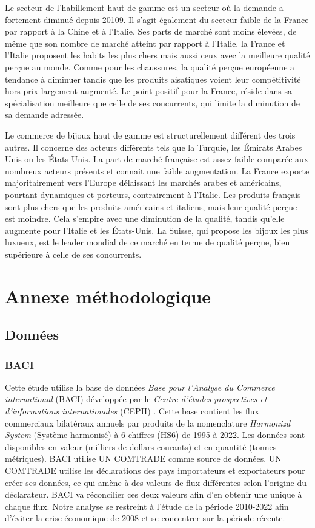 \documentclass[french,10pt,a4paper]{article}
\begin{document}
\bigskip

Le secteur de l'habillement haut de gamme est un secteur où la demande a fortement diminué depuis 20109. Il s'agit également du secteur faible de la France par rapport à la Chine et à l'Italie. Ses parts de marché sont moins élevées, de même que son nombre de marché atteint par rapport à l'Italie. la France et l'Italie proposent les habits les plus chers mais aussi ceux avec la meilleure qualité perçue au monde. Comme pour les chaussures, la qualité perçue européenne a tendance à diminuer tandis que les produits aisatiques voient leur compétitivité hors-prix largement augmenté. Le point positif pour la France, réside dans sa spécialisation meilleure que celle de ses concurrents, qui limite la diminution de sa demande adressée. 

\bigskip

Le commerce de bijoux haut de gamme est structurellement différent des trois autres. Il concerne des acteurs différents tels que la Turquie, les Émirats Arabes Unis ou les États-Unis. La part de marché française est assez faible comparée aux nombreux acteurs présents et connait une faible augmentation. La France exporte majoritairement vers l'Europe délaissant les marchés arabes et américains, pourtant dynamiques et porteurs, contrairement à l'Italie. Les produits français sont plus chers que les produits américains et italiens, mais leur qualité perçue est moindre. Cela s'empire avec une diminution de la qualité, tandis qu'elle augmente pour l'Italie et les États-Unis. La Suisse, qui propose les bijoux les plus luxueux, est le leader mondial de ce marché en terme de qualité perçue, bien supérieure à celle de ses concurrents.



\newpage

\section*{Annexe méthodologique}
\subsection*{Données}
\subsubsection*{BACI}
Cette étude utilise la base de données \textit{Base pour l'Analyse du Commerce international} (BACI) développée par le \textit{Centre d'études prospectives et d'informations internationales} (CEPII) \citep{Gaulier2010}. Cette base contient les flux commerciaux bilatéraux annuels par produits de la nomenclature \textit{Harmonizd System} (Système harmonisé) à 6 chiffres (HS6) de 1995 à 2022. Les données sont disponibles en valeur (milliers de dollars courants) et en quantité (tonnes métriques). BACI utilise UN COMTRADE comme source de données. UN COMTRADE utilise les déclarations des pays importateurs et exportateurs pour créer ses données, ce qui amène à des valeurs de flux différentes selon l'origine du déclarateur. BACI va réconcilier ces deux valeurs afin d'en obtenir une unique à chaque flux. Notre analyse se restreint à l'étude de la période 2010-2022 afin d'éviter la crise économique de 2008 et se concentrer sur la période récente.
\end{document}

